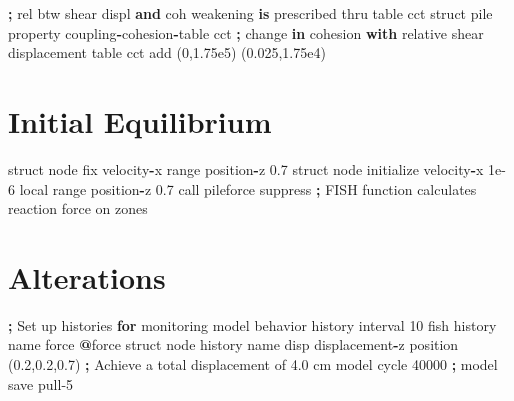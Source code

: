 \documentclass[a4paper, nobind]{templates/ociamthesis}
\newenvironment{Shaded}{\begin{snugshade}}{\end{snugshade}}
\newcommand{\BuiltInTok}[1]{#1}
\newcommand{\ControlFlowTok}[1]{\textcolor[rgb]{0.13,0.29,0.53}{\textbf{#1}}}
\newcommand{\DecValTok}[1]{\textcolor[rgb]{0.00,0.00,0.81}{#1}}
\newcommand{\FloatTok}[1]{\textcolor[rgb]{0.00,0.00,0.81}{#1}}
\newcommand{\KeywordTok}[1]{\textcolor[rgb]{0.13,0.29,0.53}{\textbf{#1}}}
\newcommand{\NormalTok}[1]{#1}
\newcommand{\OperatorTok}[1]{\textcolor[rgb]{0.81,0.36,0.00}{\textbf{#1}}}
\newcommand{\StringTok}[1]{\textcolor[rgb]{0.31,0.60,0.02}{#1}}
\renewenvironment{Shaded}
{
  \vspace{10pt}%
  \begin{snugshade}%
}{%
  \end{snugshade}%
  \vspace{8pt}%
}
\begin{document}
\begin{Shaded}
\begin{Highlighting}[]
\OperatorTok{;}\NormalTok{ rel btw shear displ }\KeywordTok{and}\NormalTok{ coh weakening }\KeywordTok{is}\NormalTok{ prescribed thru table cct}
\NormalTok{struct pile }\BuiltInTok{property}\NormalTok{ coupling}\OperatorTok{{-}}\NormalTok{cohesion}\OperatorTok{{-}}\NormalTok{table }\StringTok{\textquotesingle{}cct\textquotesingle{}}
\OperatorTok{;}\NormalTok{ change }\KeywordTok{in}\NormalTok{ cohesion }\ControlFlowTok{with}\NormalTok{ relative shear displacement}
\NormalTok{table }\StringTok{\textquotesingle{}cct\textquotesingle{}}\NormalTok{ add (}\DecValTok{0}\NormalTok{,}\FloatTok{1.75e5}\NormalTok{) (}\FloatTok{0.025}\NormalTok{,}\FloatTok{1.75e4}\NormalTok{)}
\end{Highlighting}
\end{Shaded}

\hypertarget{initial-equilibrium-2}{%
\section{Initial Equilibrium}\label{initial-equilibrium-2}}

\begin{Shaded}
\begin{Highlighting}[]
\NormalTok{struct node fix velocity}\OperatorTok{{-}}\NormalTok{x }\BuiltInTok{range}\NormalTok{ position}\OperatorTok{{-}}\NormalTok{z }\FloatTok{0.7}
\NormalTok{struct node initialize velocity}\OperatorTok{{-}}\NormalTok{x }\FloatTok{1e{-}6}\NormalTok{ local }\BuiltInTok{range}\NormalTok{ position}\OperatorTok{{-}}\NormalTok{z }\FloatTok{0.7}
\NormalTok{call }\StringTok{\textquotesingle{}pileforce\textquotesingle{}}\NormalTok{ suppress }\OperatorTok{;}\NormalTok{ FISH function calculates reaction force on zones}
\end{Highlighting}
\end{Shaded}

\hypertarget{alterations-1}{%
\section{Alterations}\label{alterations-1}}

\begin{Shaded}
\begin{Highlighting}[]
\OperatorTok{;}\NormalTok{ Set up histories }\ControlFlowTok{for}\NormalTok{ monitoring model behavior}
\NormalTok{history interval }\DecValTok{10}
\NormalTok{fish history name }\StringTok{\textquotesingle{}force\textquotesingle{}} \OperatorTok{@}\NormalTok{force}
\NormalTok{struct node history name }\StringTok{\textquotesingle{}disp\textquotesingle{}}\NormalTok{ displacement}\OperatorTok{{-}}\NormalTok{z position (}\FloatTok{0.2}\NormalTok{,}\FloatTok{0.2}\NormalTok{,}\FloatTok{0.7}\NormalTok{)}
\OperatorTok{;}\NormalTok{ Achieve a total displacement of }\FloatTok{4.0}\NormalTok{ cm}
\NormalTok{model cycle }\DecValTok{40000}
\OperatorTok{;}
\NormalTok{model save }\StringTok{\textquotesingle{}pull{-}5\textquotesingle{}}
\end{Highlighting}
\end{Shaded}
\end{document}
